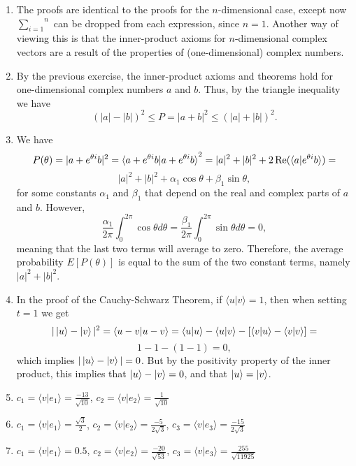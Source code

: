 \documentclass [12pt]{article}
\theoremstyle{definition}
\begin{document}
\begin{enumerate}
\item The proofs are identical to the proofs for the $n$-dimensional case, except  now $\overset{n}{\underset{i=1}{\sum}}$ can be dropped from each expression,
since $n=1$. Another way of viewing this is that the inner-product axioms for $n$-dimensional complex vectors are a result of the properties of 
(one-dimensional) complex numbers.



\item By the previous exercise, the inner-product axioms and theorems hold for one-dimensional complex numbers $a$ and $b$. Thus, by the triangle inequality
we have
\[(|a|-|b|)^2 \leq P = |a+b|^2 \leq (|a|+|b|)^2.\]



\item We have 
\[P(\theta)=|a+e^{\theta i}b|^2 = \braket{a+e^{\theta i}b|a+e^{\theta i}b}^2 = 
|a|^2 + |b|^2  + 2\operatorname{Re}(\braket{a|e^{\theta i}b}) =\]\[ |a|^2 + |b|^2 + \alpha_1\cos\theta + \beta_1\sin\theta,\]
for some constants $\alpha_1$ and $\beta_1$ that depend on the real and complex parts of  $a$ and $b$.
However,
\[\frac{\alpha_1}{2\pi}\int_0^{2\pi}\cos\theta d\theta = \frac{\beta_1}{2\pi}\int_0^{2\pi}\sin\theta d\theta = 0,\]
meaning that the last two terms will average to zero. Therefore, the average probability $E[P(\theta)]$ is equal to the sum of the two constant terms, namely
$|a|^2 + |b|^2$.

\item In the proof of the Cauchy-Schwarz Theorem, if  $\langle u|v\rangle=1$, then when setting $t=1$  we get
\[|\ket{u}-\ket{v}|^2 = \langle u-v|u-v\rangle = \langle u|u\rangle - \langle u|v\rangle - [\langle v|u \rangle-\langle v|v\rangle]=\]
\[1-1-(1-1) = 0,\]
which implies $|\ket{u}-\ket{v}|=0$. But by the positivity property of the inner product, this implies that $\ket{u}-\ket{v}=0$, and that $\ket{u}=\ket{v}$.



\item $c_1 = \langle v|e_1\rangle = \frac{-13}{\sqrt{10}}$, $c_2 = \langle v|e_2\rangle = \frac{1}{\sqrt{10}}$



\item $c_1 = \langle v|e_1\rangle = \frac{\sqrt{3}}{2}$, $c_2 = \langle v|e_2\rangle = \frac{-5}{2\sqrt{3}}$, $c_3 = \langle v|e_3\rangle = \frac{-15}{2\sqrt{3}}$

\item $c_1 = \langle v|e_1\rangle = 0.5$, $c_2 = \langle v|e_2\rangle = \frac{-20}{\sqrt{53}}$, $c_3 = \langle v|e_3\rangle = \frac{255}{\sqrt{11925}}$




\end{enumerate}
\end{document}
